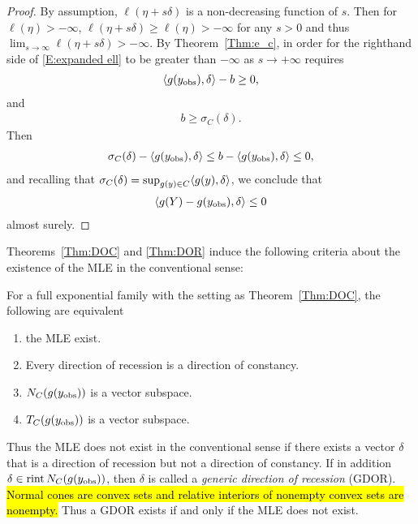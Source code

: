 \begin{proof}
By assumption, $\ell(\eta + s\delta)$ is a non-decreasing function of $s$.  
Then for $\ell(\eta ) > -\infty$, $\ell(\eta + s\delta) \geq \ell(\eta )  > -\infty$
for any $s>0$ and thus $\lim_{s \to \infty} \ell(\eta+s\delta) > -\infty$.
By Theorem~\ref{Thm:e_c}, in order for the righthand side of \eqref{E:expanded ell} 
to be greater than $-\infty$ as $s \to +\infty$ requires
\begin{align*}
	\langle g(y_{\textrm{obs}}), \delta \rangle - b \geq 0,
\end{align*}
and
\begin{align*}
	b \geq \sigma_C(\delta). %
\end{align*}
Then
\begin{align*}
	\sigma_C(\delta)  - \langle g(y_{\textrm{obs}}), \delta \rangle \leq b - \langle g(y_{\textrm{obs}}), \delta \rangle  \leq 0,
\end{align*}
and recalling that $\sigma_C(\delta) = \sup_{g(y) \in C} \langle g(y), \delta \rangle$, 
we conclude that
\begin{align*}
	\langle g(Y) - g(y_{\textrm{obs}}),\delta  \rangle \leq 0
\end{align*}
almost surely.
\end{proof}

Theorems~\ref{Thm:DOC} and \ref{Thm:DOR} induce the following criteria about the
existence of the MLE in the conventional sense:

\begin{theorem} \label{Thm:MLE existence}
For a full exponential family with the setting as Theorem~\ref{Thm:DOC}, the 
following are equivalent 
\begin{enumerate}
\item the MLE exist.
\item Every direction of recession is a direction of constancy.
\item $N_C(g(y_{\textrm{obs}}))$ is a vector subspace.
\item $T_C(g(y_{\textrm{obs}}))$ is a vector subspace.
\end{enumerate}
\end{theorem}

Thus the MLE does not exist in the conventional sense if there exists a vector 
$\delta$ that is a direction of recession but not a direction of constancy.  
If in addition $\delta \in \operatorname{rint} N_C(g(y_{\textrm{obs}}))$, then $\delta$ is called a 
\emph{generic direction of recession} (GDOR).  \hl{Normal cones are convex sets and
relative interiors of nonempty convex sets are nonempty.}  Thus 
a GDOR exists if and only if the MLE does not exist.  

